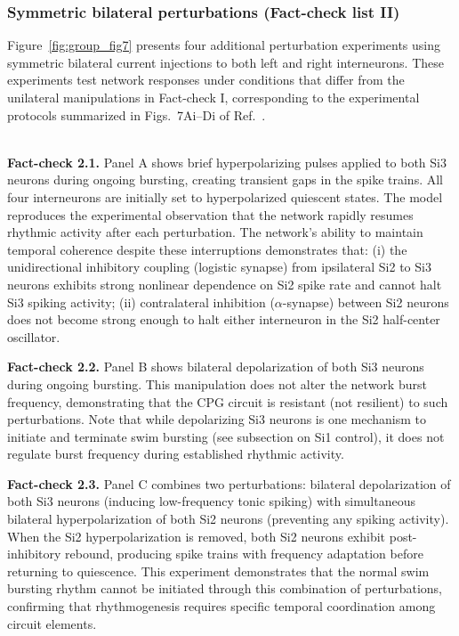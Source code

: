 \documentclass[nofootinbib,aip,amsmath,amssymb,preprint,twocolumn,floatfix,10pt]{revtex4-2}
\begin{document}

\subsubsection{Symmetric bilateral perturbations (Fact-check list II)}

Figure~\ref{fig:group_fig7} presents four additional perturbation experiments using symmetric bilateral current injections to both left and right interneurons. These experiments test network responses under conditions that differ from the unilateral manipulations in Fact-check I, corresponding to the experimental protocols summarized in Figs.~7Ai–Di of Ref.~\cite{SakuraiKatz2016}.

~\\
{\bf Fact-check 2.1.}
Panel A shows brief hyperpolarizing pulses applied to both Si3 neurons during ongoing bursting, creating transient gaps in the spike trains. All four interneurons are initially set to hyperpolarized quiescent states. The model reproduces the experimental observation that the network rapidly resumes rhythmic activity after each perturbation. The network's ability to maintain temporal coherence despite these interruptions demonstrates that: (i) the unidirectional inhibitory coupling (logistic synapse) from ipsilateral Si2 to Si3 neurons exhibits strong nonlinear dependence on Si2 spike rate and cannot halt Si3 spiking activity; (ii) contralateral inhibition ($\alpha$-synapse) between Si2 neurons does not become strong enough to halt either interneuron in the Si2 half-center oscillator. 

{\bf Fact-check 2.2.}
Panel B shows bilateral depolarization of both Si3 neurons during ongoing bursting. This manipulation does not alter the network burst frequency, demonstrating that the CPG circuit is resistant (not resilient) to such perturbations. Note that while depolarizing Si3 neurons is one mechanism to initiate and terminate swim bursting (see subsection on Si1 control), it does not regulate burst frequency during established rhythmic activity.

{\bf Fact-check 2.3.}
Panel C combines two perturbations: bilateral depolarization of both Si3 neurons (inducing low-frequency tonic spiking) with simultaneous bilateral hyperpolarization of both Si2 neurons (preventing any spiking activity). When the Si2 hyperpolarization is removed, both Si2 neurons exhibit post-inhibitory rebound, producing spike trains with frequency adaptation before returning to quiescence. This experiment demonstrates that the normal swim bursting rhythm cannot be initiated through this combination of perturbations, confirming that rhythmogenesis requires specific temporal coordination among circuit elements.
\end{document}
